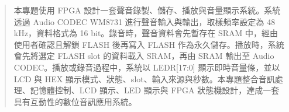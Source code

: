 \begin{abstract}
        本專題使用 FPGA 設計一套聲音錄製、儲存、播放與音量顯示系統。系統透過 Audio CODEC WM8731 進行聲音輸入與輸出，取樣頻率設定為 48 kHz，資料格式為 16 bit。錄音時，聲音資料會先暫存在 SRAM 中，經由使用者確認且解鎖 FLASH 後再寫入 FLASH 作為永久儲存。播放時，系統會先將選定 FLASH slot 的資料載入 SRAM，再由 SRAM 輸出至 Audio CODEC。播放或錄音過程中，系統以 LEDR[17:0] 顯示即時音量條，並以 LCD 與 HEX 顯示模式、狀態、slot、輸入來源與秒數。本專題整合音訊處理、記憶體控制、LCD 顯示、LED 顯示與 FPGA 狀態機設計，達成一套具有互動性的數位音訊應用系統。
\end{abstract}

